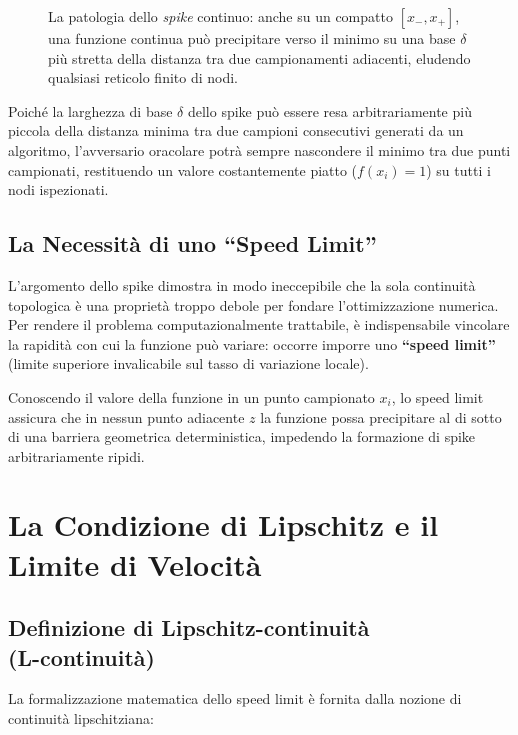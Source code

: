 \begin{figure}[H]
\caption{La patologia dello \textit{spike} continuo: anche su un compatto $[x_-, x_+]$, una funzione continua pu\`o precipitare verso il minimo su una base $\delta$ pi\`u stretta della distanza tra due campionamenti adiacenti, eludendo qualsiasi reticolo finito di nodi.}
\label{fig:pathology-spike}
\end{figure}

Poich\'e la larghezza di base $\delta$ dello spike pu\`o essere resa arbitrariamente pi\`u piccola della distanza minima tra due campioni consecutivi generati da un algoritmo, l'avversario oracolare potr\`a sempre nascondere il minimo tra due punti campionati, restituendo un valore costantemente piatto ($f(x_i) = 1$) su tutti i nodi ispezionati.

\subsection{La Necessit\`a di uno ``Speed Limit''}
L'argomento dello spike dimostra in modo ineccepibile che la sola continuit\`a topologica \`e una propriet\`a troppo debole per fondare l'ottimizzazione numerica. Per rendere il problema computazionalmente trattabile, \`e indispensabile vincolare la rapidit\`a con cui la funzione pu\`o variare: occorre imporre uno \textbf{``speed limit''} (limite superiore invalicabile sul tasso di variazione locale).

Conoscendo il valore della funzione in un punto campionato $x_i$, lo speed limit assicura che in nessun punto adiacente $z$ la funzione possa precipitare al di sotto di una barriera geometrica deterministica, impedendo la formazione di spike arbitrariamente ripidi.

\FloatBarrier
\section{La Condizione di Lipschitz e il Limite di Velocit\`a}
\label{sec:univariata-lipschitz-speed-limit}

\subsection[Definizione di Lipschitz-continuit\`a]{Definizione di Lipschitz-continuit\`a\\(L-continuit\`a)}
La formalizzazione matematica dello speed limit \`e fornita dalla nozione di continuit\`a lipschitziana:

